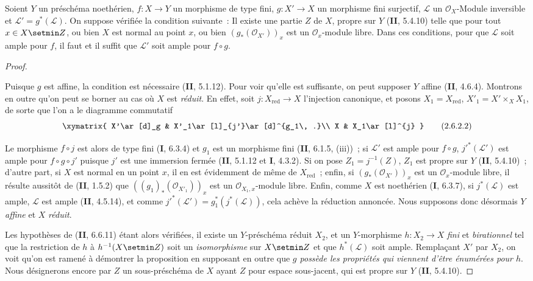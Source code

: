 \begin{proposition}[2.6.2]
\label{III.2.6.2-fr}
Soient $Y$ un préschéma noethérien, $f:X\to Y$ un morphisme de type
fini, $g:X'\to X$ un morphisme fini surjectif, $\mathcal L$ un
$\mathcal O_X$-Module inversible et $\mathcal L'=g^*(\mathcal L)$. On
suppose vérifiée la condition suivante~: Il existe une partie $Z$ de
$X$, propre sur $Y$ (\textbf{II}, 5.4.10) telle que pour tout $x\in X\setmin Z$, ou bien
$X$ est normal au point $x$, ou bien $(g_*(\mathcal O_{X'}))_x$ est un
$\mathcal O_x$-module libre. Dans ces conditions, pour que $\mathcal L$
soit ample pour $f$, il faut et il suffit que $\mathcal L'$ soit ample
pour $f\circ g$.
\end{proposition}

\begin{proof}
\begin{env}[2.6.2.1]
\label{III.2.6.2.1-fr}
Puisque $g$ est affine, la condition est nécessaire (\textbf{II}, 5.1.12). Pour
voir qu'elle est suffisante, on peut supposer $Y$ affine (\textbf{II}, 4.6.4).
Montrons en outre qu'on peut se borner au cas où $X$ est \emph{réduit}. En
effet, soit $j:X_{\mathrm{red}}\to X$ l'injection canonique, et posons
$X_1=X_{\mathrm{red}}$, $X'_1=X'\times_X X_1$, de sorte que l'on a le
diagramme commutatif
\[
\xymatrix{
X'\ar[d]_g & X'_1\ar[l]_{j'}\ar[d]^{g_1\, .}\\
X & X_1\ar[l]^{j}
}
\tag{2.6.2.2}\label{III.2.6.2.2-fr}
\]

Le morphisme $f\circ j$ est alors de type fini (\textbf{I}, 6.3.4) et $g_1$ est
un morphisme fini (\textbf{II}, 6.1.5, (iii))~; si $\mathcal L'$ est ample pour
$f\circ g$, $j'^*(\mathcal L')$ est ample pour $f\circ g\circ j'$ puisque
$j'$ est une immersion fermée (\textbf{II}, 5.1.12 et \textbf{I}, 4.3.2). Si on pose
$Z_1=j^{-1}(Z)$, $Z_1$ est propre sur $Y$ (\textbf{II}, 5.4.10)~; d'autre part,
si $X$ est normal en un point $x$, il en est évidemment de même de
$X_{\mathrm{red}}$~; enfin, si $(g_*(\mathcal O_{X'}))_x$ est un
$\mathcal O_x$-module libre, il résulte aussitôt de (\textbf{II}, 1.5.2) que
$((g_1)_*(\mathcal O_{X'_1}))_x$ est un $\mathcal O_{X_1,x}$-module
libre. Enfin, comme $X$ est noethérien (\textbf{I}, 6.3.7), si
$j^*(\mathcal L)$ est ample, $\mathcal L$ est ample (\textbf{II}, 4.5.14), et
comme $j'^*(\mathcal L')=g_1^*(j^*(\mathcal L))$, cela achève la
réduction annoncée. Nous supposons donc désormais $Y$ \emph{affine} et $X$
\emph{réduit}.
\end{env}

Les hypothèses de (\textbf{II}, 6.6.11) étant alors vérifiées, il existe un
$Y$-préschéma réduit $X_2$, et un $Y$-morphisme $h:X_2\to X$ \emph{fini} et
\emph{birationnel} tel que la restriction de $h$ à $h^{-1}(X\setmin Z)$ soit un
\emph{isomorphisme} sur $X\setmin Z$ et que $h^*(\mathcal L)$ soit ample. Remplaçant
$X'$ par $X_2$, on voit qu'on est ramené à démontrer la proposition en
supposant en outre que \emph{$g$ possède les propriétés qui viennent d'être
énumérées pour $h$}. Nous désignerons encore par $Z$ un sous-préschéma de
$X$ ayant $Z$ pour espace sous-jacent, qui est propre sur $Y$
(\textbf{II}, 5.4.10).


\end{proof}
